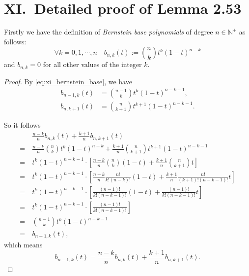 \documentclass[a4paper]{article}
\begin{document}
\section*{XI.\ Detailed proof of Lemma 2.53}

Firstly we have the definition of \textit{Bernstein base polynomials} of degree $n \in \mathbb{N}^+$ as follows:
\begin{equation}
  \forall k = 0, 1, \cdots, n \quad b_{n, k}(t) := \binom{n}{k} t^k (1 - t)^{n - k}
  \label{eq:xi_bernstein_base}
\end{equation}
and $b_{n, k} = 0$ for all other values of the integer $k$.

\begin{proof}
  By \cref{eq:xi_bernstein_base}, we have 
  \begin{equation}
    \begin{aligned}
      b_{n - 1, k}(t) &= \binom{n - 1}{k} t^k (1 - t)^{n - k - 1}, \\
      b_{n, k + 1}(t) &= \binom{n}{k + 1} t^{k + 1} (1 - t)^{n - k - 1}.
    \end{aligned}
    \label{eq:xi_bernstein_base_recurrence}
  \end{equation}

  So it follows 
  \begin{equation}
    \begin{aligned}
      & \frac{n - k}{n} b_{n, k}(t) + \frac{k + 1}{n} b_{n, k + 1}(t)  \\
      =\ & \frac{n - k}{n} \binom{n}{k} t^k (1 - t)^{n - k} + \frac{k + 1}{n} \binom{n}{k + 1} t^{k + 1} (1 - t)^{n - k - 1} \\
      =\ & t^k (1 - t)^{n - k - 1} \cdot \left[\frac{n - k}{n} \binom{n}{k} (1 - t) + \frac{k + 1}{n} \binom{n}{k + 1} t\right] \\
      =\ & t^k (1 - t)^{n - k - 1} \cdot \left[\frac{n - k}{n} \frac{n!}{k!(n - k)!} (1 - t) + \frac{k + 1}{n} \frac{n!}{(k + 1)!(n - k - 1)!} t\right] \\
      =\ & t^k (1 - t)^{n - k - 1} \cdot \left[\frac{(n - 1)!}{k!(n - k - 1)!}(1 - t) + \frac{(n - 1)!}{k!(n - k - 1)!} t\right] \\
      =\ & t^k (1 - t)^{n - k - 1} \cdot \left[\frac{(n - 1)!}{k!(n - k - 1)!}\right] \\
      =\ & \binom{n - 1}{k} t^k (1 - t)^{n - k - 1} \\
      =\ & b_{n - 1, k}(t),
    \end{aligned}
    \label{eq:xi_proof}
  \end{equation}
  which means 
  \begin{equation}
    b_{n - 1, k}(t) = \frac{n - k}{n} b_{n, k}(t) + \frac{k + 1}{n} b_{n, k + 1}(t).
    \label{eq:xi_result}
  \end{equation}
\end{proof}
\end{document}
